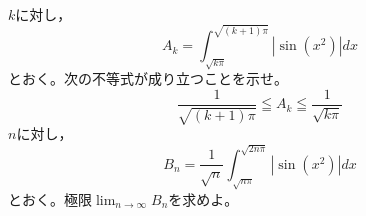\documentclass[../../main.tex]{subfiles}
\begin{document}
\begin{enumerate}
  $k$に対し，
    \[ A_k=\int_{\sqrt{k\pi}}^{\sqrt{(k+1)\pi}}|\sin(x^2)|dx \]
    とおく。次の不等式が成り立つことを示せ。
    \[ \frac{1}{\sqrt{(k+1)\pi}} \leqq A_k \leqq \frac{1}{\sqrt{k\pi}} \]
  $n$に対し，
    \[ B_n=\frac{1}{\sqrt{n}}\int_{\sqrt{n\pi}}^{\sqrt{2n\pi}}|\sin(x^2)|dx \]
    とおく。極限$\displaystyle\lim_{n\to\infty}B_n$を求めよ。
\end{enumerate}
\end{document}
